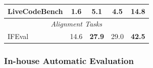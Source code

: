 \begin{table}[t]
\begin{tabular}{@{}lcccc@{}}
LiveCodeBench & 1.6 & \textbf{5.1} & 4.5 & \textbf{14.8} \\

\midrule

\multicolumn{5}{c}{\textit{Alignment Tasks}} \\

\midrule

IFEval & 14.6 & \textbf{27.9} & 29.0 & \textbf{42.5} \\

\bottomrule

\end{tabular}

\end{table}


\subsubsection{In-house Automatic Evaluation}




